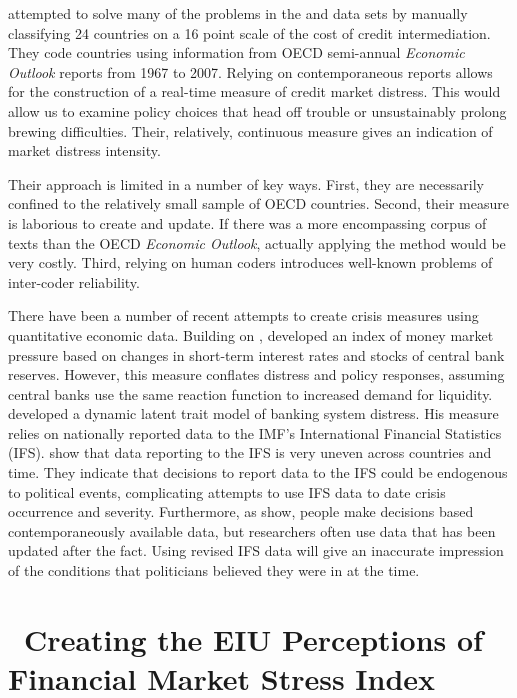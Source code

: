 \documentclass[]{article}
\begin{document}
\cite{Romer2015} attempted to solve many of the problems in the \cite{Reinhart2009} and \cite{laeven2013} data sets by manually
classifying 24 countries on a 16 point scale of the cost of
credit intermediation. They code countries using information from OECD
semi-annual \emph{Economic Outlook} reports from 1967 to 2007. Relying
on contemporaneous reports allows for the construction of a real-time
measure of credit market distress. This would allow us to examine policy
choices that head off trouble or unsustainably prolong brewing
difficulties. Their, relatively, continuous measure gives an indication
of market distress intensity.

Their approach is limited in a number of key ways. First, they
are necessarily confined to the relatively small sample of OECD
countries. Second, their measure is laborious to create and update. If there was a more encompassing corpus of texts than the OECD \emph{Economic Outlook}, actually applying the method would be very costly. Third, relying on human coders introduces well-known problems of inter-coder reliability.

There have been a number of recent attempts to create crisis measures using quantitative economic data. Building on \cite{vonHagen2007}, \cite{Jing2015} developed an index of money market pressure based on changes in short-term interest rates and stocks of central bank reserves. However, this measure conflates distress and policy responses,
assuming central banks use the same reaction function to increased
demand for liquidity. \cite{Rosas2009} developed a dynamic latent trait
model of banking system distress. His measure relies on
nationally reported data to the IMF's International Financial
Statistics (IFS). \cite{GandrudCopHal2015} show that data reporting to the IFS is very uneven across countries and time. They indicate that decisions to report data to the IFS could be endogenous to political events, complicating attempts to use IFS data to date crisis occurrence and severity. Furthermore, as \cite{KayserLeininger2015} show, people make decisions based contemporaneously available data, but researchers often use data that has been updated after the fact. Using revised IFS data will give an inaccurate impression of the conditions that politicians believed they were in at the time.

\section{~Creating the EIU Perceptions of Financial Market Stress
Index}\label{creating-the-perceptions-of-financial-market-stress-index}
\end{document}
